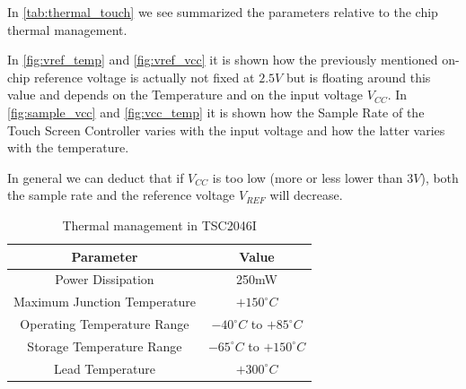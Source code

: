 \documentclass[11pt,a4paper,titlepage]{article}
\begin{document}
			In \autoref{tab:thermal_touch} we see summarized the parameters relative to the chip thermal management.

			In \autoref{fig:vref_temp} and \autoref{fig:vref_vcc} it is shown how the previously mentioned on-chip reference voltage is actually not fixed at $2.5V$ but is floating around this value and depends on the Temperature and on the input voltage $V_{CC}$. In \autoref{fig:sample_vcc} and \autoref{fig:vcc_temp} it is shown how the Sample Rate of the Touch Screen Controller varies with the input voltage and how the latter varies with the temperature.

			In general we can deduct that if $V_{CC}$ is too low (more or less lower than $3V$), both the sample rate and the reference voltage $V_{REF}$ will decrease.


			\begin{table}[htbp]
				\centering
				\begin{tabular}{cc}
					\toprule
					Parameter & Value\\
					\midrule
					Power Dissipation		 & 250mW\\
					Maximum Junction Temperature  & $+150^\circ C$\\
					Operating Temperature Range & $-40^\circ C$ to $+85^\circ C$ \\
					Storage Temperature Range & $-65^\circ C$ to $+150^\circ C$ \\
					Lead Temperature  & $+300^\circ C$\\
					\bottomrule
				\end{tabular}
				\caption{Thermal management in TSC2046I}
				\label{tab:thermal_touch}
			\end{table}
\end{document}
